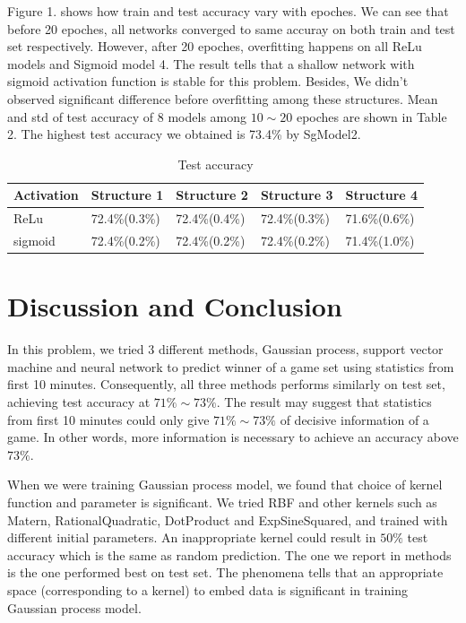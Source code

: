 \documentclass{article}
\begin{document}
Figure 1. shows how train and test accuracy vary with epoches. We can see that before 20 epoches, all networks converged to same accuray on both train and test set respectively. However, after 20 epoches, overfitting happens on all ReLu models and Sigmoid model 4. The result tells that a shallow network with sigmoid activation function is stable for this problem. Besides, We didn't observed significant difference before overfitting among these structures. Mean and std of test accuracy of 8 models among $10\sim 20$ epoches are shown in Table 2. The highest test accuracy we obtained is 73.4\% by SgModel2.

\begin{table}[h!]
\caption{Test accuracy}
\centering
\begin{tabular}{ |p{2cm}||p{2cm}|p{2cm}|p{2cm}|p{2cm}|  }
\hline
Activation & Structure 1& Structure 2 &Structure 3 & Structure 4 \\
\hline
ReLu & 72.4\%(0.3\%) & 72.4\%(0.4\%) & 72.4\%(0.3\%) & 71.6\%(0.6\%) \\
\hline 
sigmoid & 72.4\%(0.2\%) & 72.4\%(0.2\%) & 72.4\%(0.2\%) & 71.4\%(1.0\%) \\
\hline
\end{tabular}
\end{table}

\section{Discussion and Conclusion}

In this problem, we tried 3 different methods, Gaussian process, support vector machine and neural network to predict winner of a game set using statistics from first 10 minutes. Consequently, all three methods performs similarly on test set, achieving test accuracy at $71\%\sim73\%$. The result may suggest that statistics from first 10 minutes could only give $71\%\sim73\%$ of decisive information of a game. In other words, more information is necessary to achieve an accuracy above $73\%$.

When we were training Gaussian process model, we found that choice of kernel function and parameter is significant. We tried RBF and other kernels such as Matern, RationalQuadratic, DotProduct and ExpSineSquared, and trained with different initial parameters. An inappropriate kernel could result in $50\%$ test accuracy which is the same as random prediction. The one we report in methods is the one performed best on test set. The phenomena tells that an appropriate space (corresponding to a kernel) to embed data is significant in training Gaussian process model.
\end{document}
